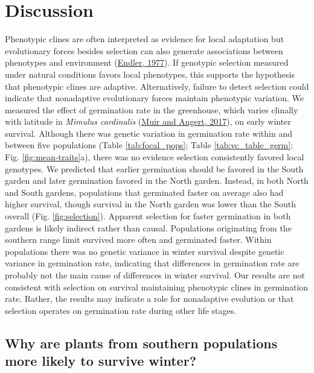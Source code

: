 \documentclass[
  12pt,
]{article}
\begin{document}
\hypertarget{discussion}{%
\section{Discussion}\label{discussion}}

Phenotypic clines are often interpreted as evidence for local adaptation but evolutionary forces besides selection can also generate associations between phenotypes and environment (\protect\hyperlink{ref-endler_geographic_1977}{Endler, 1977}). If genotypic selection measured under natural conditions favors local phenotypes, this supports the hypothesis that phenotypic clines are adaptive. Alternatively, failure to detect selection could indicate that nonadaptive evolutionary forces maintain phenotypic variation. We measured the effect of germination rate in the greenhouse, which varies clinally with latitude in \emph{Mimulus cardinalis} (\protect\hyperlink{ref-muir_grow_2017}{Muir and Angert, 2017}), on early winter survival. Although there was genetic variation in germination rate within and between five populations (Table \ref{tab:focal_pops}; Table \ref{tab:vc_table_germ}; Fig. \ref{fig:mean-traits}a), there was no evidence selection consistently favored local genotypes. We predicted that earlier germination should be favored in the South garden and later germination favored in the North garden. Instead, in both North and South gardens, populations that germinated faster on average also had higher survival, though survival in the North garden was lower than the South overall (Fig. \ref{fig:selection}). Apparent selection for faster germination in both gardens is likely indirect rather than causal. Populations originating from the southern range limit survived more often and germinated faster. Within populations there was no genetic variance in winter survival despite genetic variance in germination rate, indicating that differences in germination rate are probably not the main cause of differences in winter survival. Our results are not consistent with selection on survival maintaining phenotypic clines in germination rate. Rather, the results may indicate a role for nonadaptive evolution or that selection operates on germination rate during other life stages.

\hypertarget{why-are-plants-from-southern-populations-more-likely-to-survive-winter}{%
\subsection{Why are plants from southern populations more likely to survive winter?}\label{why-are-plants-from-southern-populations-more-likely-to-survive-winter}}
\end{document}
